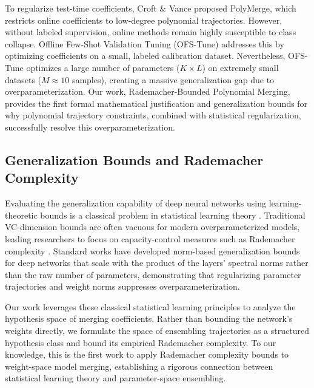 To regularize test-time coefficients, Croft \& Vance \cite{polymerge2024} proposed PolyMerge, which restricts online coefficients to low-degree polynomial trajectories. However, without labeled supervision, online methods remain highly susceptible to class collapse. Offline Few-Shot Validation Tuning (OFS-Tune) \cite{suitemerge2025} addresses this by optimizing coefficients on a small, labeled calibration dataset. Nevertheless, OFS-Tune optimizes a large number of parameters ($K \times L$) on extremely small datasets ($M \approx 10$ samples), creating a massive generalization gap due to overparameterization. Our work, Rademacher-Bounded Polynomial Merging, provides the first formal mathematical justification and generalization bounds for why polynomial trajectory constraints, combined with statistical regularization, successfully resolve this overparameterization.

\subsection{Generalization Bounds and Rademacher Complexity}
Evaluating the generalization capability of deep neural networks using learning-theoretic bounds is a classical problem in statistical learning theory \cite{vapnik1999overview, shalev2014understanding}. Traditional VC-dimension bounds are often vacuous for modern overparameterized models, leading researchers to focus on capacity-control measures such as Rademacher complexity \cite{bartlett2002rademacher, koltchinskii2002empirical}. Standard works have developed norm-based generalization bounds for deep networks \cite{neyshabur2015norm, bartlett2017spectrally} that scale with the product of the layers' spectral norms rather than the raw number of parameters, demonstrating that regularizing parameter trajectories and weight norms suppresses overparameterization.

Our work leverages these classical statistical learning principles to analyze the hypothesis space of merging coefficients. Rather than bounding the network's weights directly, we formulate the space of ensembling trajectories as a structured hypothesis class and bound its empirical Rademacher complexity. To our knowledge, this is the first work to apply Rademacher complexity bounds to weight-space model merging, establishing a rigorous connection between statistical learning theory and parameter-space ensembling.
